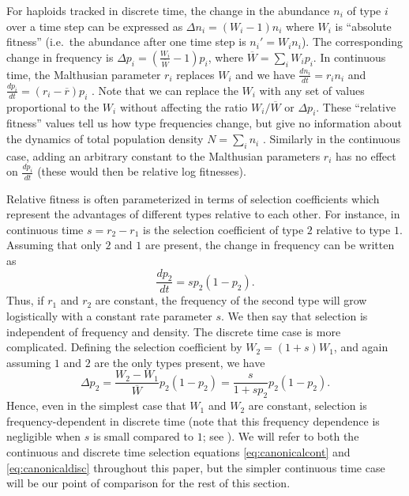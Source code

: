 \documentclass[12pt]{article}
\begin{document}
For haploids tracked in discrete time, the change in the abundance $n_i$ of type $i$ over a time step can be expressed as $\Delta n_i=(W_i - 1)n_i$ where $W_i$ is ``absolute fitness'' (i.e.~the abundance after one time step is $n_i'=W_i n_i$). The corresponding change in frequency is $\Delta p_i=\left(\frac{W_i}{\overline{W}}-1\right) p_i$, where $\overline{W}=\sum_i W_i p_i$. In continuous time, the Malthusian parameter $r_i$ replaces $W_i$ and we have $\frac{d n_i}{dt}=r_in_i$ and $\frac{d p_i}{dt}=(r_i-\overline{r}) p_i$ \citep{crow_1970}. Note that we can replace the $W_i$ with any set of values proportional to the $W_i$ without affecting the  ratio $W_i/\overline{W}$ or $\Delta p_i$. These ``relative fitness'' values tell us how type frequencies change, but give no information about the dynamics of total population density $N=\sum_i n_i$ \citep[pp. 468]{barton_2007}. Similarly in the continuous case, adding an arbitrary constant to the Malthusian parameters $r_i$ has no effect on $\frac{d p_i}{dt}$ (these would then be relative log fitnesses). 

Relative fitness is often parameterized in terms of selection coefficients which represent the advantages of different types relative to each other. For instance, in continuous time $s=r_2-r_1$ is the selection coefficient of type $2$ relative to type $1$. Assuming that only $2$ and $1$ are present, the change in frequency can be written as
\begin{equation}
\frac{d p_2}{dt}=s p_2 (1-p_2). \label{eq:canonicalcont}
\end{equation}
Thus, if $r_1$ and $r_2$ are constant, the frequency of the second type will grow logistically with a constant rate parameter $s$. We then say that selection is independent of frequency and density. The discrete time case is more complicated. Defining the selection coefficient by $W_2=(1+s)W_1$, and again assuming $1$ and $2$ are the only types present, we have  
\begin{equation}
\Delta p_2=\frac{W_2-W_1}{\overline{W}} p_2 (1-p_2)=\frac{s}{1+sp_2} p_2 (1-p_2). \label{eq:canonicaldisc}
\end{equation}
Hence, even in the simplest case that $W_1$ and $W_2$ are constant, selection is frequency-dependent in discrete time (note that this frequency dependence is negligible when $s$ is small compared to $1$; see \citealt{frank_2011}). We will refer to both the continuous and discrete time selection equations \eqref{eq:canonicalcont} and \eqref{eq:canonicaldisc} throughout this paper, but the simpler continuous time case will be our point of comparison for the rest of this section.  
 
\end{document}
